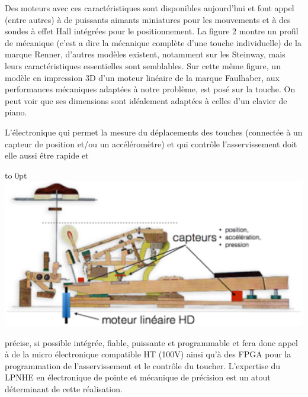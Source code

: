 \documentclass[french,a4paper,12pt]{report}
\begin{document}
Des moteurs avec ces caractéristiques sont disponibles aujourd’hui et font appel (entre autres) à de puissants aimants miniatures pour les mouvements et à des sondes à effet Hall intégrées pour le positionnement. La figure 2 montre un profil de mécanique (c’est a dire la mécanique complète d’une touche individuelle) de la marque Renner, d’autres modèles existent, notamment sur les Steinway, mais leurs caractéristiques essentielles sont semblables. Sur cette même figure, un modèle en impression 3D d’un moteur linéaire de la marque Faulhaber, aux performances mécaniques adaptées à notre problème, est posé sur la touche. On peut voir que ses dimensions sont idéalement adaptées à celles d’un clavier de piano.

L’électronique qui permet la mesure du déplacements des touches (connectée à un capteur de position et/ou un accéléromètre) et qui contrôle l’asservissement doit elle aussi être rapide et  \newline

\hfill\hbox to 0pt{\hss\includegraphics[width=15cm]{MECA_PIANO3.png}\hss}\hfill\null\newline

précise, si possible intégrée, fiable, puissante et programmable et fera donc appel à de la micro électronique compatible HT (100V) ainsi qu’à des FPGA pour la programmation de l’asservissement et le contrôle du toucher. L’expertise du LPNHE en électronique de pointe et mécanique de précision est un atout déterminant de cette réalisation.
\end{document}

